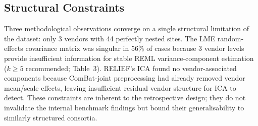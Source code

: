 \documentclass[12pt,a4paper]{article}
\begin{document}
\subsection{Structural Constraints}

Three methodological observations converge on a single structural limitation of the dataset: only 3 vendors with 44 perfectly nested sites. The LME random-effects covariance matrix was singular in 56\% of cases because 3 vendor levels provide insufficient information for stable REML variance-component estimation ($k\geq5$ recommended; Table~3). RELIEF's ICA found no vendor-associated components because ComBat-joint preprocessing had already removed vendor mean/scale effects, leaving insufficient residual vendor structure for ICA to detect. These constraints are inherent to the retrospective design; they do not invalidate the internal benchmark findings but bound their generalisability to similarly structured consortia.
\end{document}
